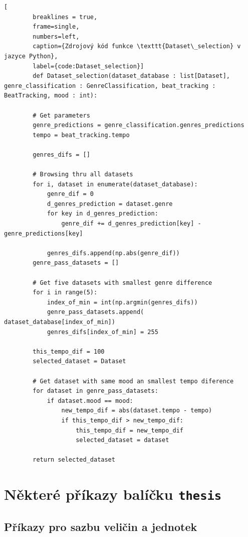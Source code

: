 \begin{minipage}{\linewidth}
	\begin{lstlisting}[
		breaklines = true,
		frame=single,
		numbers=left,
		caption={Zdrojový kód funkce \texttt{Dataset\_selection} v jazyce Python},
		label={code:Dataset_selection}]
		def Dataset_selection(dataset_database : list[Dataset], genre_classification : GenreClassification, beat_tracking : BeatTracking, mood : int):

		# Get parameters 
		genre_predictions = genre_classification.genres_predictions
		tempo = beat_tracking.tempo
	
		genres_difs = []
	
		# Browsing thru all datasets
		for i, dataset in enumerate(dataset_database):
			genre_dif = 0
			d_genres_prediction = dataset.genre
			for key in d_genres_prediction:
				genre_dif += d_genres_prediction[key] - genre_predictions[key]
	
			genres_difs.append(np.abs(genre_dif))
		genre_pass_datasets = []
	
		# Get five datasets with smallest genre difference
		for i in range(5):
			index_of_min = int(np.argmin(genres_difs))
			genre_pass_datasets.append( dataset_database[index_of_min])
			genres_difs[index_of_min] = 255
	
		this_tempo_dif = 100
		selected_dataset = Dataset
		
		# Get dataset with same mood an smallest tempo diference
		for dataset in genre_pass_datasets:
			if dataset.mood == mood:
				new_tempo_dif = abs(dataset.tempo - tempo)
				if this_tempo_dif > new_tempo_dif:
					this_tempo_dif = new_tempo_dif
					selected_dataset = dataset
	
		return selected_dataset
	\end{lstlisting}
\end{minipage}



\chapter{Některé příkazy balíčku \texttt{thesis}}

\section{Příkazy pro sazbu veličin a jednotek}

